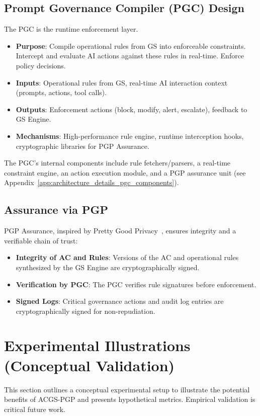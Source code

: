 \documentclass[sigconf,review,anonymous=false]{acmart} %
\begin{document}
\subsection{Prompt Governance Compiler (PGC) Design}
The PGC is the runtime enforcement layer.
\begin{itemize}
    \item \textbf{Purpose}: Compile operational rules from GS into enforceable constraints. Intercept and evaluate AI actions against these rules in real-time. Enforce policy decisions.
    \item \textbf{Inputs}: Operational rules from GS, real-time AI interaction context (prompts, actions, tool calls).
    \item \textbf{Outputs}: Enforcement actions (block, modify, alert, escalate), feedback to GS Engine.
    \item \textbf{Mechanisms}: High-performance rule engine, runtime interception hooks, cryptographic libraries for PGP Assurance.
\end{itemize}
The PGC's internal components include rule fetchers/parsers, a real-time constraint engine, an action execution module, and a PGP assurance unit (see Appendix~\ref{app:architecture_details_pgc_components}).

\subsection{Assurance via PGP}
PGP Assurance, inspired by Pretty Good Privacy~\cite{WikipediaPGP}, ensures integrity and a verifiable chain of trust:
\begin{itemize}
    \item \textbf{Integrity of AC and Rules}: Versions of the AC and operational rules synthesized by the GS Engine are cryptographically signed.
    \item \textbf{Verification by PGC}: The PGC verifies rule signatures before enforcement.
    \item \textbf{Signed Logs}: Critical governance actions and audit log entries are cryptographically signed for non-repudiation.
\end{itemize}

\section{Experimental Illustrations (Conceptual Validation)}
\label{sec:experimental_illustrations}
This section outlines a conceptual experimental setup to illustrate the potential benefits of ACGS-PGP and presents hypothetical metrics. Empirical validation is critical future work.
\end{document}
